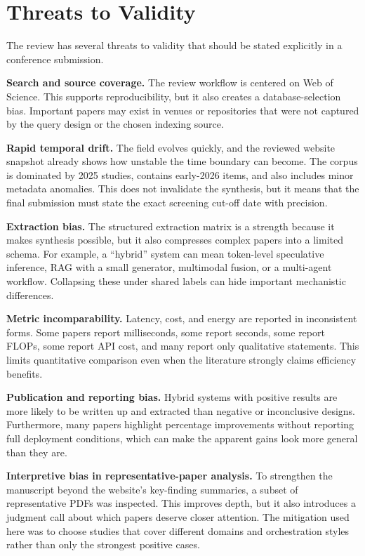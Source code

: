 \section{Threats to Validity}
The review has several threats to validity that should be stated explicitly in a conference submission.

\textbf{Search and source coverage.} The review workflow is centered on Web of Science. This supports reproducibility, but it also creates a database-selection bias. Important papers may exist in venues or repositories that were not captured by the query design or the chosen indexing source.

\textbf{Rapid temporal drift.} The field evolves quickly, and the reviewed website snapshot already shows how unstable the time boundary can become. The corpus is dominated by 2025 studies, contains early-2026 items, and also includes minor metadata anomalies. This does not invalidate the synthesis, but it means that the final submission must state the exact screening cut-off date with precision.

\textbf{Extraction bias.} The structured extraction matrix is a strength because it makes synthesis possible, but it also compresses complex papers into a limited schema. For example, a ``hybrid'' system can mean token-level speculative inference, RAG with a small generator, multimodal fusion, or a multi-agent workflow. Collapsing these under shared labels can hide important mechanistic differences.

\textbf{Metric incomparability.} Latency, cost, and energy are reported in inconsistent forms. Some papers report milliseconds, some report seconds, some report FLOPs, some report API cost, and many report only qualitative statements. This limits quantitative comparison even when the literature strongly claims efficiency benefits.

\textbf{Publication and reporting bias.} Hybrid systems with positive results are more likely to be written up and extracted than negative or inconclusive designs. Furthermore, many papers highlight percentage improvements without reporting full deployment conditions, which can make the apparent gains look more general than they are.

\textbf{Interpretive bias in representative-paper analysis.} To strengthen the manuscript beyond the website's key-finding summaries, a subset of representative PDFs was inspected. This improves depth, but it also introduces a judgment call about which papers deserve closer attention. The mitigation used here was to choose studies that cover different domains and orchestration styles rather than only the strongest positive cases.
